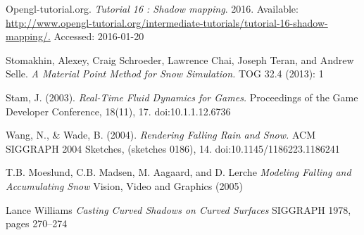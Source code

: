 \documentclass[a4paper,12pt]{article}
\begin{document}
\newpage

\begin{thebibliography}{9}
    Opengl-tutorial.org.
    \emph{Tutorial 16 : Shadow mapping}.
    2016.
    Available: \url{http://www.opengl-tutorial.org/intermediate-tutorials/tutorial-16-shadow-mapping/.}
    Accessed: 2016-01-20

    Stomakhin, Alexey, Craig Schroeder, Lawrence Chai, Joseph Teran, and Andrew Selle.
    \emph{A Material Point Method for Snow Simulation.}
    TOG 32.4 (2013): 1

    Stam, J. (2003).
    \emph{Real-Time Fluid Dynamics for Games.}
    Proceedings of the Game Developer Conference, 18(11), 17. doi:10.1.1.12.6736

    Wang, N., \& Wade, B. (2004).
    \emph{Rendering Falling Rain and Snow.}
    ACM SIGGRAPH 2004 Sketches, (sketches 0186), 14. doi:10.1145/1186223.1186241

    T.B. Moeslund, C.B. Madsen, M. Aagaard, and D. Lerche
    \emph{Modeling Falling and Accumulating Snow}
    Vision, Video and Graphics (2005)

    Lance Williams
    \emph{Casting Curved Shadows on Curved Surfaces}
    SIGGRAPH 1978, pages 270–274

\end{thebibliography}
\end{document}
